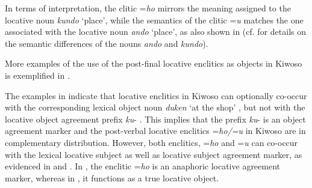 \documentclass[output=paper]{langscibook}
\begin{document}
In terms of interpretation, the clitic =\textit{ho} mirrors the meaning assigned to the locative noun \textit{kundo} ‘place’, while the semantics of the clitic =\textit{u} matches the one associated with the locative noun \textit{ando} ‘place’, as also shown in  (cf.  for details on the semantic differences of the nouns \textit{ando} and \textit{kundo}).

More examples of the use of the post-final locative enclitics as objects in Kiwoso is exemplified in . 

\ea\label{ex:mallya:21}



    \z
\z

The examples in  indicate that locative enclitics in Kiwoso can optionally co-occur with the corresponding lexical object noun \textit{duken} ‘at the shop’ , but not with the locative object agreement prefix \textit{ku}{}- . This implies that the prefix \textit{ku}{}- is an object agreement marker and the post-verbal locative enclitics =\textit{ho/=u} in Kiwoso are in complementary distribution. However, both enclitics, =\textit{ho} and =\textit{u} can co-occur with the lexical locative subject as well as locative subject agreement marker, as evidenced in  and . In , the enclitic =\textit{ho} is an anaphoric locative agreement marker, whereas in , it functions as a true locative object.
\end{document}

